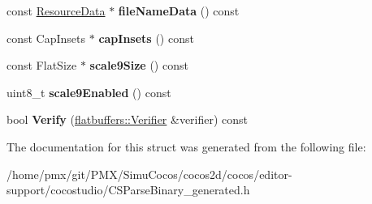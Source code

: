\begin{DoxyCompactItemize}
const \hyperlink{structflatbuffers_1_1ResourceData}{Resource\+Data} $\ast$ {\bfseries file\+Name\+Data} () const
\item 
\mbox{\label{structflatbuffers_1_1ImageViewOptions_ad29fac4b0100158bbf72b752e3894378}} 
const Cap\+Insets $\ast$ {\bfseries cap\+Insets} () const
\item 
\mbox{\label{structflatbuffers_1_1ImageViewOptions_a0735c4e97aced054f50575de1c4c40c3}} 
const Flat\+Size $\ast$ {\bfseries scale9\+Size} () const
\item 
\mbox{\label{structflatbuffers_1_1ImageViewOptions_ae8e7f482a592be5604bbf74af12d9add}} 
uint8\+\_\+t {\bfseries scale9\+Enabled} () const
\item 
\mbox{\label{structflatbuffers_1_1ImageViewOptions_a47d6b17d1e73cba634b2d6dec16f0f91}} 
bool {\bfseries Verify} (\hyperlink{classflatbuffers_1_1Verifier}{flatbuffers\+::\+Verifier} \&verifier) const
\end{DoxyCompactItemize}


The documentation for this struct was generated from the following file\+:\begin{DoxyCompactItemize}
\item 
/home/pmx/git/\+P\+M\+X/\+Simu\+Cocos/cocos2d/cocos/editor-\/support/cocostudio/C\+S\+Parse\+Binary\+\_\+generated.\+h\end{DoxyCompactItemize}
